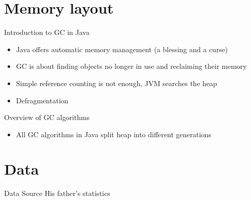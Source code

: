 \documentclass[10pt, xcolor=x11names,compress]{beamer}
\begin{document}
\section{Memory layout}
 
\begin{frame}{Introduction to GC in Java}

\begin{itemize}
 \item Java offers automatic memory management (a blessing and a curse)
 \item GC is about finding objects no longer in use and reclaiming their memory
 \item Simple reference counting is not enough, JVM searches the heap
 \item Defragmentation  
\end{itemize}
\end{frame}

\begin{frame}{Overview of GC algorithms}

  \begin{itemize}
   \item All GC algorithms in Java split heap into different generations
   
  \end{itemize}

\end{frame}
  
\section{Data}
\begin{frame}{Data Source}
His father's statistics
   
\end{frame}
\end{document}
